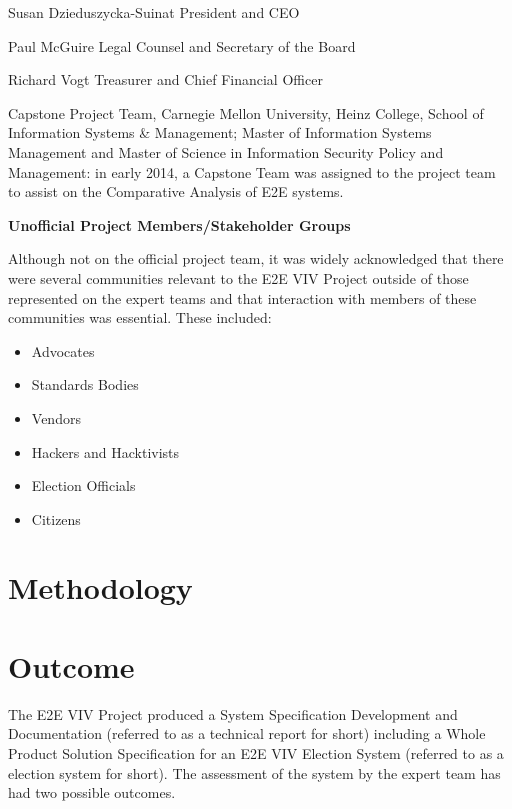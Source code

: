 Susan Dzieduszycka-Suinat
President and CEO
 
Paul McGuire
Legal Counsel and Secretary of the Board
 
Richard Vogt
Treasurer and Chief Financial Officer

Capstone Project Team, Carnegie Mellon University, Heinz College,
School of Information Systems \& Management; Master of Information
Systems Management and Master of Science in Information Security
Policy and Management: in early 2014, a Capstone Team was assigned to
the project team to assist on the Comparative Analysis of E2E systems.

\textbf{Unofficial Project Members/Stakeholder Groups}

Although not on the official project team, it was widely acknowledged
that there were several communities relevant to the E2E VIV Project
outside of those represented on the expert teams and that interaction
with members of these communities was essential. These included: 

\begin{itemize}
\item Advocates
\item Standards Bodies
\item Vendors
\item Hackers and Hacktivists
\item Election Officials 
\item Citizens
\end{itemize}


\section{Methodology}


\section{Outcome}

The E2E VIV Project produced a System Specification Development and
Documentation (referred to as a technical report for short) including
a Whole Product Solution Specification for an E2E VIV Election System
(referred to as a election system for short). The assessment of the
system by the expert team has had two possible outcomes. 

